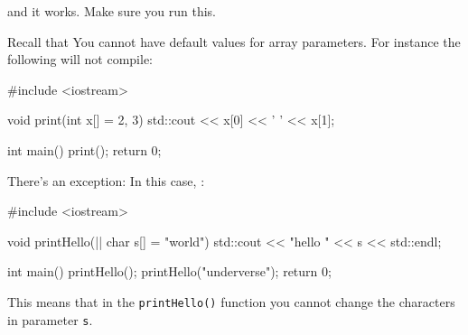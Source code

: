 and it works. Make sure you run this.



\newpage{}

Recall that You cannot have default values for array parameters. For instance the following will not compile:

\begin{consolethree}[escapeinside=||]
#include <iostream>

void print(int x[] = {2, 3})
{
    std::cout << x[0] << ' ' << x[1];
}

int main()
{
    print();
    return 0;
}
\end{consolethree}

There's an exception:  In this case, :

\begin{consolethree}[escapeinside=||]
#include <iostream>

void printHello(|| char s[] = "world")
{
    std::cout << "hello " << s << std::endl;
}

int main()
{
    printHello();
    printHello("underverse");
    return 0;
}
\end{consolethree}

This means that in the \texttt{printHello()} function you cannot change the characters in parameter \texttt{s}.


